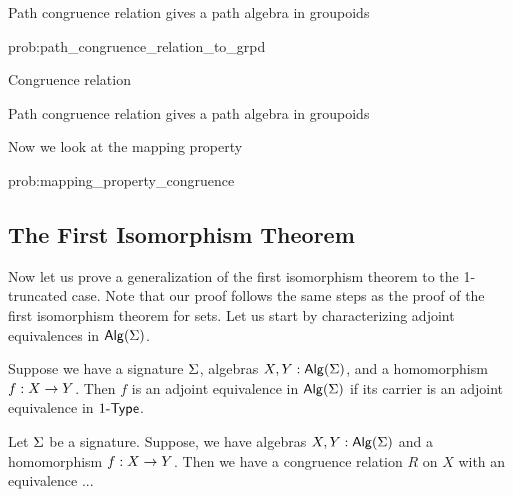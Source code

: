 \begin{problem}
\label{prob:path_congruence_relation_to_grpd}
Path congruence relation gives a path algebra in groupoids
\end{problem}

\begin{construction}{prob:path_congruence_relation_to_grpd}

\end{construction}

\begin{definition}
Congruence relation
\end{definition}

\begin{problem}
\label{prob:congruence_relation_to_grpd}
Path congruence relation gives a path algebra in groupoids
\end{problem}

Now we look at the mapping property

\begin{problem}
\label{prob:mapping_property_congruence}

\end{problem}

\begin{construction}{prob:mapping_property_congruence}
\label{constr:mapping_property_congruence}

\end{construction}

\subsection{The First Isomorphism Theorem}
Now let us prove a generalization of the first isomorphism theorem to the 1-truncated case.
Note that our proof follows the same steps as the proof of the first isomorphism theorem for sets.
Let us start by characterizing adjoint equivalences in $\mathsf{Alg}(\Sigma)$.

\begin{proposition}
\label{prop:algebra_adjequiv}
Suppose we have a signature $\Sigma$, algebras $X, Y : \mathsf{Alg}(\Sigma)$, and a homomorphism $f : X \rightarrow Y$.
Then $f$ is an adjoint equivalence in $\mathsf{Alg}(\Sigma)$ if its carrier is an adjoint equivalence in $1\mbox{-}\mathsf{Type}$.
\end{proposition}

\begin{theorem}
Let $\Sigma$ be a signature.
Suppose, we have algebras $X, Y : \mathsf{Alg}(\Sigma)$ and a homomorphism $f : X \rightarrow Y$.
Then we have a congruence relation $R$ on $X$ with an equivalence ... 
\end{theorem}

